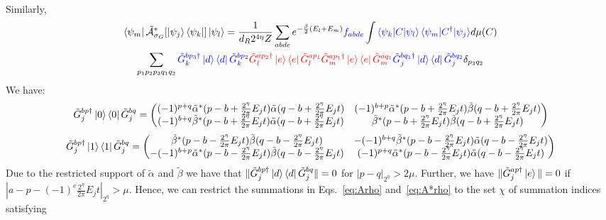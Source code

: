 \documentclass[aps,floatfix,10pt,amssymb,amsfont,amsmath,superscriptaddress,float,nofootinbib,longbibliography,nobalancelastpage,twocolumn]{revtex4-2}
\begin{document}
\begin{widetext}
\begin{multline}
    \label{eq:Arho}
\end{multline}
Similarly,
\begin{multline}
   \bra{\psi_m}\tilde{\mathcal{A}}^*_{\sigma_G}[\ket{\psi_j}\bra{\psi_k}]\ket{\psi_l} =\frac{1}{d_R2^{4\eta}Z} \sum_{abde} e^{-\frac{\beta}{2}(E_l+E_m)}\textcolor{blue}{f_{abde}} \int \textcolor{blue}{\braket{\psi_k|C|\psi_l}\braket{\psi_m|C^{\dagger}|\psi_j}} d\mu(C)\\\sum_{p_1p_2 p_3q_1 q_2} \textcolor{blue}{\tilde G^{bp_3\dagger}_k\ket{d}\bra{d}\tilde G^{bp_2}_k} \textcolor{red}{\tilde G_l^{ap_2\dagger}\ket{e}\bra{e}\tilde G_l^{ap_1}\tilde G_m^{ap_1\dagger}\ket{e}\bra{e}\tilde G_m^{aq_1}} \textcolor{blue}{\tilde G^{bq_1\dagger}_j\ket{d}\bra{d}\tilde G^{bq_2}_j } \delta_{p_3q_2}
    \label{eq:A*rho}
\end{multline}
We have:
\begin{equation}
    \tilde G^{bp\dagger}_{j}\ket{0}\bra{0} \tilde G^{bq}_{j} = \begin{pmatrix}
        (-1)^{p+q}\tilde \alpha^*(p-b+\frac{2^{\eta}}{2\pi}E_{j}t)\tilde  \alpha(q-b+\frac{2^{\eta}}{2\pi}E_{j}t) &(-1)^{b+p}\tilde  \alpha^*(p-b+\frac{2^{\eta}}{2\pi}E_{j}t)\tilde  \beta(q-b+\frac{2^{\eta}}{2\pi}E_{j}t)  \\(-1)^{b+q}\tilde  \beta^*(p-b+\frac{2^{\eta}}{2\pi}E_{j}t)\tilde  \alpha(q-b+\frac{2^{\eta}}{2\pi}E_{j}t) & \tilde  \beta^*(p-b+\frac{2^{\eta}}{2\pi}E_{j}t)\tilde  \beta(q-b+\frac{2^{\eta}}{2\pi}E_{j}t)
    \end{pmatrix}
\end{equation} 
\begin{equation}
    \tilde G^{bp\dagger}_{j}\ket{1}\bra{1} \tilde G^{bq}_{j} = \begin{pmatrix}
        \tilde \beta^*(p-b-\frac{2^{\eta}}{2\pi}E_{j}t)\tilde  \beta(q-b-\frac{2^{\eta}}{2\pi}E_{j}t) &  -(-1)^{b+q}\tilde  \beta^*(p-b-\frac{2^{\eta}}{2\pi}E_{j}t)\tilde \alpha(q-b-\frac{2^{\eta}}{2\pi}E_{j}t) \\
        -(-1)^{b+p}\tilde  \alpha^*(p-b-\frac{2^{\eta}}{2\pi}E_{j}t)\tilde  \beta(q-b-\frac{2^{\eta}}{2\pi}E_{j}t) & (-1)^{p+q}\tilde  \alpha^*(p-b-\frac{2^{\eta}}{2\pi}E_{j}t)\tilde \alpha(q-b-\frac{2^{\eta}}{2\pi}E_{j}t)
    \end{pmatrix}
\end{equation} 
Due to the restricted support of $\tilde \alpha$ and $\tilde \beta$ we have that $\|\tilde G^{bp\dagger}_{j}\ket{d}\bra{d}\tilde G^{bq}_{j}\| = 0$ for $|p-q|_{2^{\eta}} > 2\mu$. Further, we have $\|\tilde G^{ap \dagger}_j \ket{e}\| = 0$ if $|a-p-(-1)^e\frac{2^{\eta}}{2\pi}E_{j}t|_{2^{\eta}} > \mu$. Hence, we can restrict the summations in Eqs.~\eqref{eq:Arho} and~\eqref{eq:A*rho} to the set $\chi$ of summation indices satisfying

\end{widetext}
\end{document}
